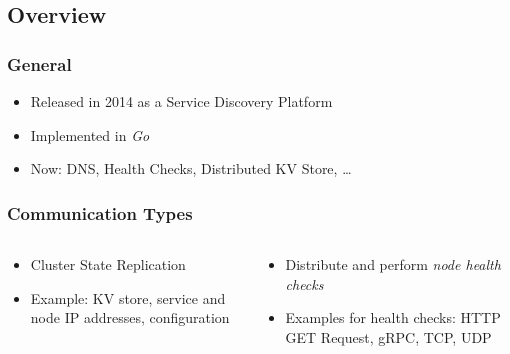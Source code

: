
\subsection{Overview}

\begin{frame}
	\frametitle{General}
	\begin{itemize}
		\item Released in 2014 as a Service Discovery Platform
		\item Implemented in \emph{Go}
		\item Now: DNS, Health Checks, Distributed KV Store, \ldots
	\end{itemize}
\end{frame}

\begin{frame}
	\frametitle{Communication Types}
	\begin{columns}[b]
		\begin{column}{0.5\textwidth}
			\begin{block}
				\begin{itemize}
					\item<2-> Cluster State Replication
					\item<3-> Example: KV store, service and node IP addresses, configuration
				\end{itemize}
			\end{block}
		\end{column}
		\begin{column}{0.5\textwidth}
			\begin{block}
				\begin{itemize}
					\item<4-> Distribute and perform \emph{node health checks}
					\item<5-> Examples for health checks: HTTP GET Request, gRPC, TCP, UDP
				\end{itemize}
			\end{block}
		\end{column}
	\end{columns}
\end{frame}

